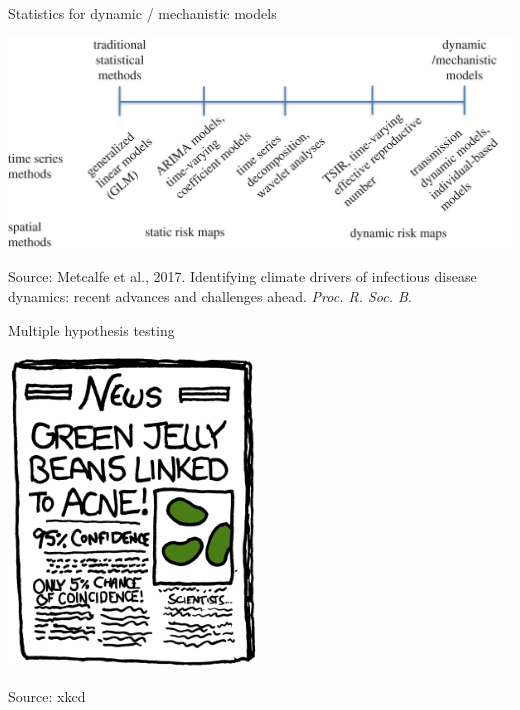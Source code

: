 \documentclass[ignorenonframetext,]{beamer}
\begin{document}
\begin{frame}{Statistics for dynamic / mechanistic models}

\begin{center}\includegraphics[width=\textwidth]{figures/F2large} \end{center}

\footnotesize{Source: Metcalfe et al., 2017. Identifying climate drivers of infectious disease dynamics: recent advances and challenges ahead. \textit{Proc. R. Soc. B}.}

\end{frame}

\begin{frame}{Multiple hypothesis testing}

\begin{center}\includegraphics[width=0.5\textwidth]{figures/GreenJellyBeans} \end{center}

\footnotesize{Source: xkcd}

\end{frame}
\end{document}
